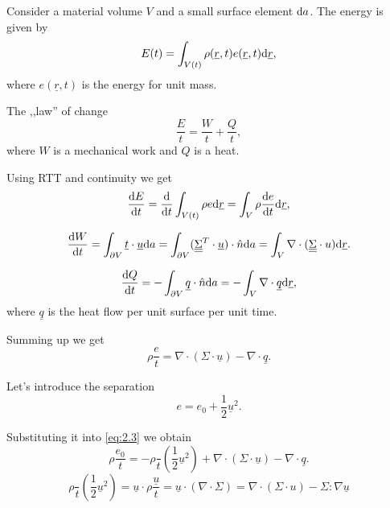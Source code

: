 \documentclass[11pt,oneside]{book}
\renewcommand{\vec}[1]{\underline{#1}}
\theoremstyle{definition} %
\theoremstyle{plain} %
\theoremstyle{remark} %
\theoremstyle{underline}
\begin{document}
  Consider a material volume $V$ and a small surface element $\mathrm{d} a$.
  The energy is given by 
  \begin{displaymath}
    E(t) = \int_{V (t)} \rho (\vec r ,t ) e (\vec r, t) \d \vec r ,
  \end{displaymath}
  where $e (\vec r, t)$ is the energy for unit mass.

  The ,,law'' of change
  \begin{displaymath}
    \dfrac{E}{t} = \dfrac{W}{t} + \dfrac{Q}{t},
  \end{displaymath}
  where $W$ is a mechanical work and $Q$ is a heat.

  Using RTT and continuity we get
  \begin{displaymath}
    \dfrac{E}{t} = \dfrac{}{t} \int_{V(t)} \rho e \d \vec r = \int_V \rho \dfrac{e}{t} \d \vec r,
  \end{displaymath}
  
  \begin{displaymath}
    \dfrac{W}{t} = \int_{\partial V } \vec t \cdot \vec u \d a 
    = \int_{\partial V} (\ten \Sigma^T \cdot \vec u ) \cdot \hat n  \d a 
    = \int_V \nabla \cdot ( \ten \Sigma \cdot u) \d \vec r.
  \end{displaymath}

  \begin{displaymath}
    \dfrac{Q}{t} = - \int_{\partial V} \vec q \cdot  \hat n \d a = - \int_V \nabla \cdot \vec q \d \vec r,
  \end{displaymath}
  where $\vec q$ is the heat flow per unit surface per unit time. %

  Summing up we get
  \begin{equation}
    \rho \dfrac{ e}{t} = \nabla \cdot ( \Sigma \cdot \vec u) - \nabla \cdot \vec q.
    \label{eq:2.3}
  \end{equation}

  Let's introduce the separation 
  \begin{displaymath}
    e = e_0 + \frac{1}{2} \vec u^2.
  \end{displaymath}

  Substituting it into \ref{eq:2.3} we obtain
  \begin{displaymath}
    \rho \dfrac{e_0}{t} = - \rho \dfrac{}{t} \left( \frac{1}{2} \vec u^2 \right) + \nabla \cdot (\Sigma \cdot \vec u ) - \nabla \cdot \vec q.
  \end{displaymath}
  \begin{displaymath}
    \rho \dfrac{}{t} \left( \frac{1}{2} \vec u ^2  \right) 
    = \vec u \cdot \rho \dfrac{\vec u}{t} 
    = \vec u \cdot ( \nabla \cdot \Sigma) 
    = \nabla \cdot ( \Sigma \cdot u) - \Sigma :\nabla \vec u %
  \end{displaymath}
  
\end{document}
